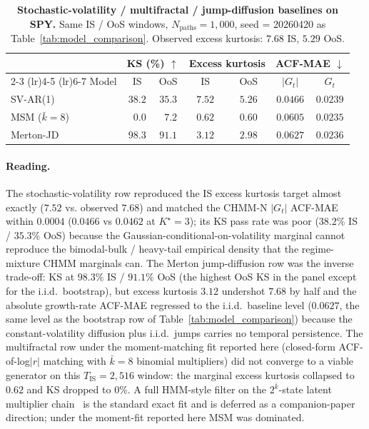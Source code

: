\begin{table}[!ht]
\centering
\small
\caption{\textbf{Stochastic-volatility / multifractal / jump-diffusion baselines on SPY.} Same IS / OoS windows, $N_{\text{paths}} = 1{,}000$, seed = 20260420 as Table~\ref{tab:model_comparison}. Observed excess kurtosis: $7.68$ IS, $5.29$ OoS.}
\label{tab:sv_msm_jd}
\begin{tabular}{l cc cc cc}
\toprule
& \multicolumn{2}{c}{KS (\%) $\uparrow$} & \multicolumn{2}{c}{Excess kurtosis} & \multicolumn{2}{c}{ACF-MAE $\downarrow$} \\
\cmidrule(lr){2-3} \cmidrule(lr){4-5} \cmidrule(lr){6-7}
Model & IS & OoS & IS & OoS & $|G_t|$ & $G_t$ \\
\midrule
SV-AR(1)        & $38.2$ & $35.3$ & $7.52$ & $5.26$ & $0.0466$ & $0.0239$ \\
MSM ($\bar k = 8$) & $\phantom{0}0.0$ & $\phantom{0}7.2$ & $0.62$ & $0.60$ & $0.0605$ & $0.0235$ \\
Merton-JD       & $98.3$ & $91.1$ & $3.12$ & $2.98$ & $0.0627$ & $0.0236$ \\
\bottomrule
\end{tabular}
\end{table}

\paragraph{Reading.}
The stochastic-volatility row reproduced the IS excess kurtosis target almost exactly ($7.52$ vs. observed $7.68$) and matched the CHMM-N $|G_t|$ ACF-MAE within $0.0004$ ($0.0466$ vs $0.0462$ at $K^\star = 3$); its KS pass rate was poor ($38.2\%$ IS / $35.3\%$ OoS) because the Gaussian-conditional-on-volatility marginal cannot reproduce the bimodal-bulk / heavy-tail empirical density that the regime-mixture CHMM marginals can. The Merton jump-diffusion row was the inverse trade-off: KS at $98.3\%$ IS / $91.1\%$ OoS (the highest OoS KS in the panel except for the i.i.d.\ bootstrap), but excess kurtosis $3.12$ undershot $7.68$ by half and the absolute growth-rate ACF-MAE regressed to the i.i.d.\ baseline level ($0.0627$, the same level as the bootstrap row of Table~\ref{tab:model_comparison}) because the constant-volatility diffusion plus i.i.d.\ jumps carries no temporal persistence. The multifractal row under the moment-matching fit reported here (closed-form ACF-of-log$|r|$ matching with $\bar k = 8$ binomial multipliers) did not converge to a viable generator on this $T_{\text{IS}} = 2{,}516$ window: the marginal excess kurtosis collapsed to $0.62$ and KS dropped to $0\%$. A full HMM-style filter on the $2^{\bar k}$-state latent multiplier chain~\citep{calvet2004regime} is the standard exact fit and is deferred as a companion-paper direction; under the moment-fit reported here MSM was dominated.

